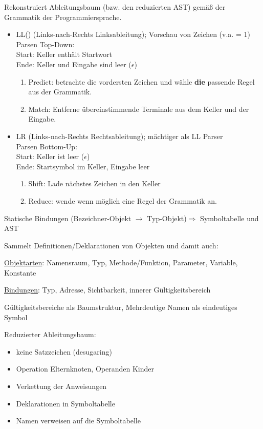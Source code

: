 Rekonstruiert Ableitungsbaum (bzw. den reduzierten AST) gemäß der Grammatik der Programmiersprache.
\begin{itemize}
\item LL(\K) (Links-nach-Rechts Linksableitung); Vorschau von \K Zeichen (v.a. \K = 1)\\ 
		Parsen Top-Down: \\
		Start: Keller enthält Startwort\\
		Ende: Keller und Eingabe sind leer ($\epsilon$)
	\begin{enumerate}
		\item Predict: betrachte die vordersten \K Zeichen und wähle \textbf{die} passende Regel aus der Grammatik.
		\item Match: Entferne übereinstimmende Terminale aus dem Keller und der Eingabe.
	\end{enumerate}
	
	
\item LR (Links-nach-Rechts Rechtsableitung); mächtiger als LL Parser\\
	Parsen Bottom-Up:\\
		Start: Keller ist leer ($\epsilon$)\\
		Ende: Startsymbol im Keller, Eingabe leer
	\begin{enumerate}
		\item Shift: Lade nächstes Zeichen in den Keller
		\item Reduce: wende wenn möglich eine Regel der Grammatik an.
	\end{enumerate}
		

\end{itemize}


Statische Bindungen (Bezeichner-Objekt $\rightarrow$ Typ-Objekt)$\Rightarrow$ Symboltabelle und AST

 Sammelt Definitionen/Deklarationen von Objekten und damit auch:

\underline{Objektarten}: Namensraum, Typ, Methode/Funktion, Parameter, Variable, Konstante

\underline{Bindungen}: Typ, Adresse, Sichtbarkeit, innerer Gültigkeitsbereich

Gültigkeitsbereiche als Baumstruktur, Mehrdeutige Namen als eindeutiges Symbol


Reduzierter Ableitungsbaum: 
\begin{itemize}
	\item keine Satzzeichen (desugaring)
	\item Operation Elternknoten, Operanden Kinder
	\item Verkettung der Anweisungen
	\item Deklarationen in Symboltabelle
	\item Namen verweisen auf die Symboltabelle
\end{itemize}

